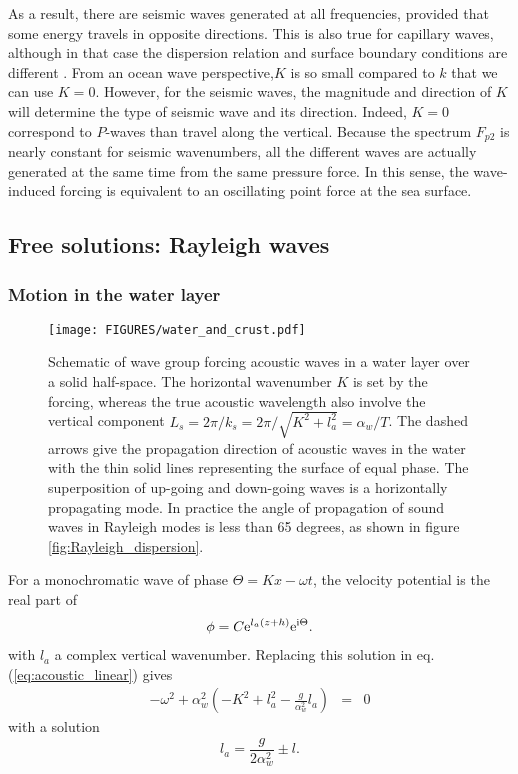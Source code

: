 As a result, there are seismic waves generated at all frequencies, provided that some energy 
travels in  opposite directions. This is also true for capillary waves, although in that case the dispersion relation and 
surface boundary conditions are different  \citep{Farrell&Munk2008}. 
From an ocean wave perspective,$K$ is so small compared to $k$ that we can use $K=0$. 
However, for the seismic waves, the magnitude and direction of $K$ will determine the type of seismic wave and its direction. 
Indeed, $K=0$ correspond to $P$-waves than travel along the vertical. Because the spectrum $F_{p2}$ is nearly constant for seismic wavenumbers, 
all the different waves are actually generated at the same time from the same pressure force.  In this sense, the wave-induced forcing is equivalent 
to an oscillating point force at the sea surface. 

\subsection{Free solutions: Rayleigh waves}
\subsubsection{Motion in the water layer}
\begin{figure}[ht]
\centerline{\texttt{[image: FIGURES/water\_and\_crust.pdf]}}
  \caption{Schematic of wave group forcing acoustic waves in a water layer over a solid half-space. 
  The horizontal wavenumber $K$ is set by the forcing, whereas the true acoustic wavelength also involve the vertical 
  component $L_s=2\pi /k_s=2\pi /\sqrt{K^2+l_a^2}=\alpha_w/T$. The dashed arrows give the propagation direction of 
  acoustic waves in the water with the thin solid lines representing the surface of equal phase. 
  The superposition of up-going and down-going waves is a horizontally propagating mode. 
  In practice the angle of propagation of sound waves in Rayleigh modes is less than 65 degrees, as shown in figure \ref{fig:Rayleigh_dispersion}. }
\label{fig:water_and_crust}
\end{figure}

For a monochromatic wave of phase $\Theta = K x-\omega t$, the velocity potential is the real part of 
\begin{eqnarray}
 \phi = C \mathrm{e}^{l_a (z+h)} \mathrm{e}^{\mathrm{i} \Theta}.
\end{eqnarray}
 with  $l_a$  a complex vertical wavenumber.  Replacing this solution in eq. (\ref{eq:acoustic_linear}) gives 
\begin{eqnarray}
 -\omega^2  + \alpha_w^2 \left( -K^2 +l_a^2 -  \frac{g}{\alpha_w^2} l_a\right)  & = & 0
\end{eqnarray}
with a solution
\begin{equation}
 l_a = \frac{  g}{2 \alpha_w^2} \pm l.
\end{equation}

